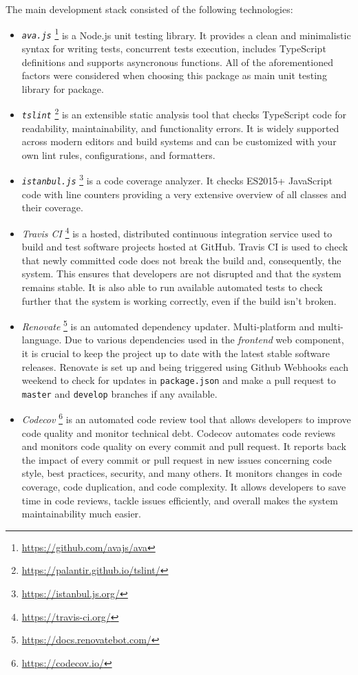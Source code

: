The main development stack consisted of the following technologies: 
\begin{itemize}
    \item \textit{\texttt{ava.js}} \footnote{\url{https://github.com/avajs/ava}} is a Node.js unit testing library. It provides a clean and minimalistic syntax for writing tests, concurrent tests execution, includes TypeScript definitions and supports asyncronous functions. All of the aforementioned factors were considered when choosing this package as main unit testing library for \lpas{} package.
    
    \item \textit{\texttt{tslint}} \footnote{\url{https://palantir.github.io/tslint/}} is an extensible static analysis tool that checks TypeScript code for readability, maintainability, and functionality errors. It is widely supported across modern editors and build systems and can be customized with your own lint rules, configurations, and formatters.
    
    \item \textit{\texttt{istanbul.js}} \footnote{\url{https://istanbul.js.org/}} is a code coverage analyzer. It checks ES2015+ JavaScript code with line counters providing a very extensive overview of all classes and their coverage.
    
    \item \textit{Travis CI} \footnote{\url{https://travis-ci.org/}} is a hosted, distributed continuous integration service used to build and test software projects hosted at GitHub. Travis CI is used to check that newly committed code does not break the build and, consequently, the system. This ensures that developers are not disrupted and that the system remains stable. It is also able to run available automated tests to check further that the system is working correctly, even if the build isn't broken.

    \item \textit{Renovate} \footnote{\url{https://docs.renovatebot.com/}} is an automated dependency updater. Multi-platform and multi-language. Due to various dependencies used in the \emph{frontend} web component, it is crucial to keep the project up to date with the latest stable software releases. Renovate is set up and being triggered using Github Webhooks each weekend to check for updates in \texttt{package.json} and make a pull request to \texttt{master} and \texttt{develop} branches if any available.

    \item \textit{Codecov} \footnote{\url{https://codecov.io/}} is an automated code review tool that allows developers to improve code quality and monitor technical debt. Codecov automates code reviews and monitors code quality on every commit and pull request. It reports back the impact of every commit or pull request in new issues concerning code style, best practices, security, and many others. It monitors changes in code coverage, code duplication, and code complexity. It allows developers to save time in code reviews, tackle issues efficiently, and overall makes the system maintainability much easier.
    

\end{itemize}

